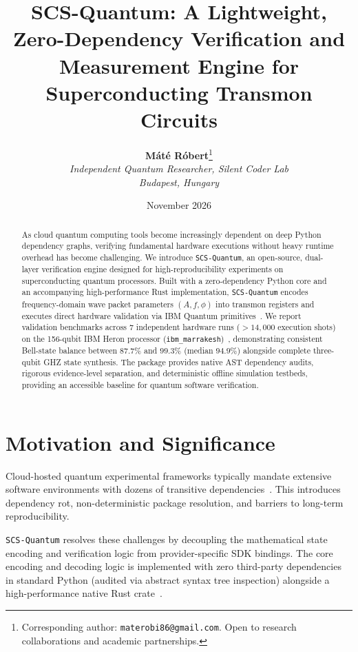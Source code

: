 \documentclass[11pt,a4paper]{article}
\title{\textbf{SCS-Quantum: A Lightweight, Zero-Dependency Verification and Measurement Engine for Superconducting Transmon Circuits}}
\author{
  \textbf{M\'at\'e R\'obert}\thanks{Corresponding author: \texttt{materobi86@gmail.com}. Open to research collaborations and academic partnerships.}\\
  \textit{Independent Quantum Researcher, Silent Coder Lab}\\
  \textit{Budapest, Hungary}
}
\date{November 2026}
\begin{document}
\maketitle

\begin{abstract}
As cloud quantum computing tools become increasingly dependent on deep Python dependency graphs, verifying fundamental hardware executions without heavy runtime overhead has become challenging. We introduce \texttt{SCS-Quantum}, an open-source, dual-layer verification engine designed for high-reproducibility experiments on superconducting quantum processors. Built with a zero-dependency Python core and an accompanying high-performance Rust implementation, \texttt{SCS-Quantum} encodes frequency-domain wave packet parameters $(A, f, \phi)$ into transmon registers and executes direct hardware validation via IBM Quantum primitives~\cite{cross2018qiskit,heron2024}. We report validation benchmarks across 7 independent hardware runs ($>14{,}000$ execution shots) on the 156-qubit IBM Heron processor (\texttt{ibm\_marrakesh})~\cite{heron2024,blais_cqed}, demonstrating consistent Bell-state balance between $87.7\%$ and $99.3\%$ (median $94.9\%$) alongside complete three-qubit GHZ state synthesis. The package provides native AST dependency audits, rigorous evidence-level separation, and deterministic offline simulation testbeds, providing an accessible baseline for quantum software verification.
\end{abstract}

\section{Motivation and Significance}
Cloud-hosted quantum experimental frameworks typically mandate extensive software environments with dozens of transitive dependencies~\cite{cross2018qiskit,cirq2021,bergholm2018pennylane}. This introduces dependency rot, non-deterministic package resolution, and barriers to long-term reproducibility. 

\texttt{SCS-Quantum} resolves these challenges by decoupling the mathematical state encoding and verification logic from provider-specific SDK bindings. The core encoding and decoding logic is implemented with zero third-party dependencies in standard Python (audited via abstract syntax tree inspection) alongside a high-performance native Rust crate~\cite{matsakis2014rust}.
\end{document}
